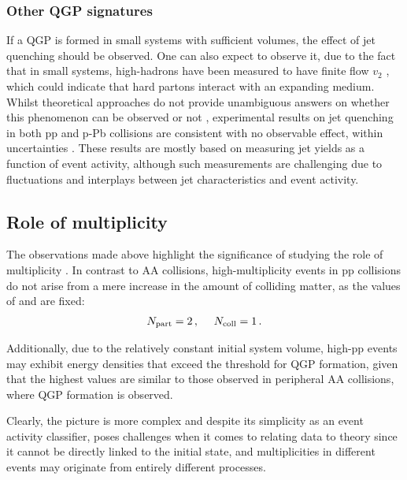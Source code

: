 \subsubsection*{Other QGP signatures}

If a QGP is formed in small systems with sufficient volumes, the effect of jet quenching should be observed. One can also expect to observe it, due to the fact that in small systems, high-\pt hadrons have been measured to have finite flow $v_2$ \cite{cmscollaborationEllipticFlowCharm2018}, which could indicate that hard partons interact with an expanding medium. Whilst theoretical approaches do not provide unambiguous answers on whether this phenomenon can be observed \cite{zakharovPartonEnergyLoss2014} or not \cite{chenCentralityDependenceProductions2015}, experimental results on jet quenching in both pp and p-Pb collisions are consistent with no observable effect, within uncertainties \cite{alicecollaborationConstraintsJetQuenching2018}. These results are mostly based on measuring jet yields as a function of event activity, although such measurements are challenging due to fluctuations and interplays between jet characteristics and event activity.

\subsection{Role of multiplicity}

The observations made above highlight the significance of studying the role of multiplicity \Nch. In contrast to AA collisions, high-multiplicity events in pp collisions do not arise from a mere increase in the amount of colliding matter, as the values of \Npart and \Ncoll are fixed:
\begin{align}
N_\mathrm{part} = 2 \, ,\quad \ N_\mathrm{coll} = 1 \, .
\end{align} 

Additionally, due to the relatively constant initial system volume, high-\Nch pp events may exhibit energy densities that exceed the threshold for QGP formation, given that the highest \Nch values are similar to those observed in peripheral AA collisions, where QGP formation is observed.

Clearly, the picture is more complex and despite its simplicity as an event activity classifier, \Nch poses challenges when it comes to relating data to theory since it cannot be directly linked to the initial state, and multiplicities in different events may originate from entirely different processes.

